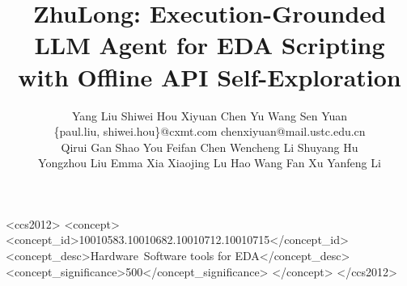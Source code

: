 \documentclass[sigconf]{acmart}
\begin{document}
\title{ZhuLong: Execution-Grounded LLM Agent for EDA Scripting with Offline API Self-Exploration}

\author{%
  \begin{tabular}{c}
    Yang Liu \quad Shiwei Hou \quad Xiyuan Chen \quad Yu Wang \quad Sen Yuan \\[1pt]
    {\small \{paul.liu, shiwei.hou\}@cxmt.com \quad chenxiyuan@mail.ustc.edu.cn} \\[4pt]
    Qirui Gan \quad Shao You \quad Feifan Chen \quad Wencheng Li \quad Shuyang Hu \\[1pt]
    Yongzhou Liu \quad Emma Xia \quad Xiaojing Lu \quad Hao Wang \quad Fan Xu \quad Yanfeng Li
  \end{tabular}
}


\renewcommand{\shortauthors}{Liu et al.}



\begin{CCSXML}
<ccs2012>
   <concept>
       <concept_id>10010583.10010682.10010712.10010715</concept_id>
       <concept_desc>Hardware~Software tools for EDA</concept_desc>
       <concept_significance>500</concept_significance>
       </concept>
 </ccs2012>
\end{CCSXML}


\end{document}
